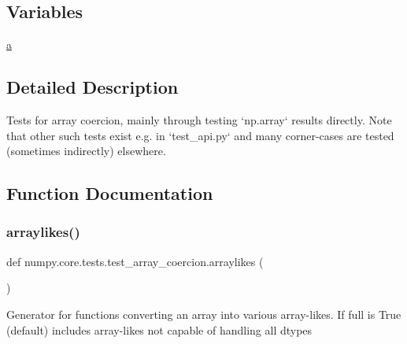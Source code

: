\subsection*{Variables}
\begin{DoxyCompactItemize}
\item 
\hyperlink{namespacenumpy_1_1core_1_1tests_1_1test__array__coercion_af7280b4e939b2b2de78d9579223fab50}{a}
\end{DoxyCompactItemize}


\subsection{Detailed Description}
\begin{DoxyVerb}Tests for array coercion, mainly through testing `np.array` results directly.
Note that other such tests exist e.g. in `test_api.py` and many corner-cases
are tested (sometimes indirectly) elsewhere.
\end{DoxyVerb}
 

\subsection{Function Documentation}
\mbox{\label{namespacenumpy_1_1core_1_1tests_1_1test__array__coercion_a9e29bbf3f7a61359fd7f0e6d209c2e40}} 
\subsubsection{\texorpdfstring{arraylikes()}{arraylikes()}}
{\footnotesize\ttfamily def numpy.\+core.\+tests.\+test\+\_\+array\+\_\+coercion.\+arraylikes (\begin{DoxyParamCaption}{ }\end{DoxyParamCaption})}

\begin{DoxyVerb}Generator for functions converting an array into various array-likes.
If full is True (default) includes array-likes not capable of handling
all dtypes
\end{DoxyVerb}
 \mbox{\label{namespacenumpy_1_1core_1_1tests_1_1test__array__coercion_a5558fd4669aff55a30433bbfb240fdea}} 
